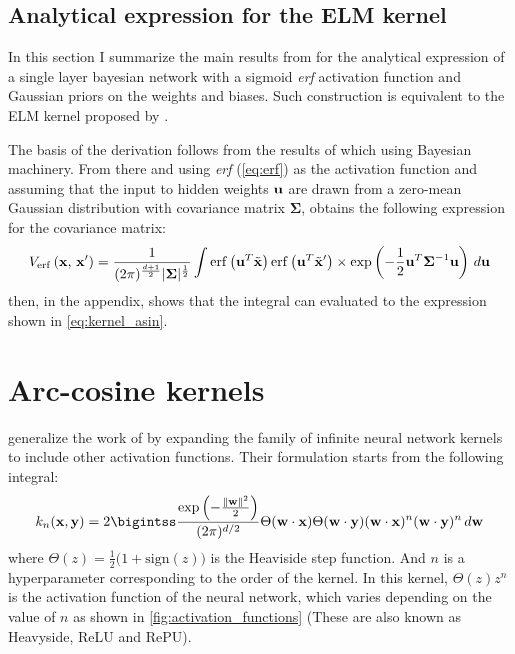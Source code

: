 \subsection{Analytical expression for the ELM kernel}

In this section I summarize the main results from
\textcite{williamsComputationInfiniteNeural1998} for the analytical expression
of a single layer bayesian network with a sigmoid \emph{erf} activation function
and Gaussian priors on the weights and biases. Such construction is equivalent
to the ELM kernel proposed by
\textcite{frenayParameterinsensitiveKernelExtreme2011}.

The basis of the derivation follows from the results of
\textcite{mackayBayesianMethodsAdaptive1999,nealBayesianTrainingBackpropagation1992}
which using Bayesian machinery. From there and using \emph{erf} (\cref{eq:erf})
as the activation function and assuming that the input to hidden weights
$\textbf u$ are drawn from a zero-mean Gaussian distribution with covariance
matrix $\boldsymbol\Sigma$, \citeauthor{williamsComputationInfiniteNeural1998}
obtains the following expression for the covariance matrix:
\begin{equation}\label{eq:integral_williams}
    V_{\operatorname{erf}}\left(\mathbf{x},\,\mathbf{x}'\right) = \frac{1}{(2\pi)^{\frac{d+1}{2}}|\boldsymbol\Sigma|^{\frac{1}{2}}}
    \int
    \operatorname{erf} \left(\textbf u^T \tilde {\mathbf{x}}\right)
    \operatorname{erf} \left(\textbf u^T \tilde {\mathbf{x}}'\right) \times \exp \left(
    -\frac{1}{2} \textbf u^T \boldsymbol\Sigma^{-1} \textbf u
    \right) \,d\textbf u
\end{equation}
then, in the appendix, \citeauthor{williamsComputationInfiniteNeural1998} shows
that the integral can evaluated to the expression shown in
\cref{eq:kernel_asin}.


\section{Arc-cosine kernels}

\Textcite{choLargemarginClassificationInfinite2010} generalize the work of
\textcite{williamsComputationInfiniteNeural1998} by expanding the family of
infinite neural network kernels to include other activation functions. Their
formulation starts from the following integral:
\begin{equation}\label{eq:integral_cho}
    k_n(\x, \y) = 2 \bigintss \frac{\exp\left(-\frac{\lVert \textbf w \rVert^2}{2}\right)}{(2\pi)^{d/2}}
    \Theta(\textbf w \cdot \x) \Theta(\textbf w \cdot \y) (\textbf w \cdot \x)^n (\textbf w \cdot \y)^n \,d\textbf w
\end{equation}
where $\Theta(z) = \frac{1}{2} \bigl(1 + \text{sign}(z)\bigr)$ is the Heaviside
step function. And $n$ is a hyperparameter corresponding to the order of the
kernel. In this kernel, $\Theta(z)z^n$ is the activation function of the neural
network, which varies depending on the value of $n$ as shown in
\cref{fig:activation_functions} (These are also known as Heavyside, ReLU and RePU).

